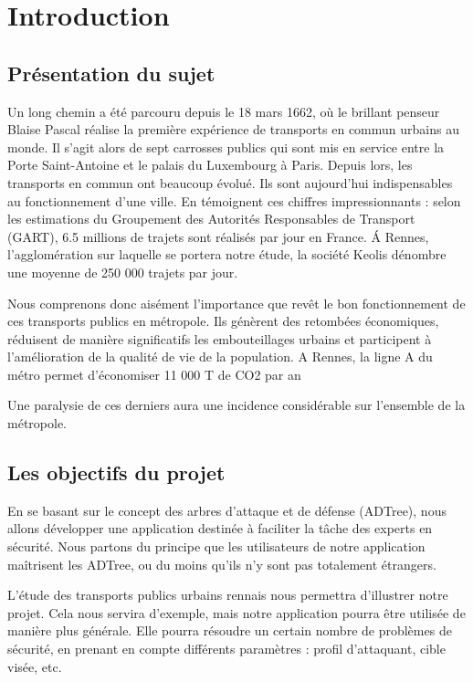 \section{Introduction}

\subsection{Présentation du sujet}


Un long chemin a été parcouru depuis le 18 mars 1662, où le brillant penseur Blaise Pascal réalise la première expérience de transports en commun urbains au monde. Il s'agit alors de sept carrosses publics qui sont mis en service entre la Porte Saint-Antoine et le palais du Luxembourg à Paris. Depuis lors, les transports en commun ont beaucoup évolué. Ils sont aujourd'hui indispensables au fonctionnement d'une ville. En témoignent ces chiffres impressionnants : selon les estimations du Groupement des Autorités Responsables de Transport (GART), 6.5 millions de trajets sont réalisés par jour en France. \'A Rennes, l'agglomération sur laquelle se portera notre étude, la société Keolis dénombre une moyenne de 250 000 trajets par jour. %


Nous comprenons donc aisément l'importance que revêt le bon fonctionnement de ces transports publics en métropole. Ils génèrent des retombées économiques, réduisent de manière significatifs les embouteillages urbains et participent à l’amélioration de la qualité de vie de la population. A Rennes, la ligne A du métro permet d'économiser 11 000 T de CO2 par an \cite{bilanLA}

 
Une paralysie de ces derniers aura une incidence considérable sur l'ensemble de la métropole.

\subsection{Les objectifs du projet}

En se basant sur le concept des arbres d’attaque et de défense (ADTree), nous allons développer une application destinée à faciliter la tâche des experts en sécurité. Nous partons du principe que les utilisateurs de notre application maîtrisent les ADTree, ou du moins qu’ils n’y sont pas totalement étrangers.


L’étude des transports publics urbains rennais nous permettra d’illustrer notre projet. Cela nous servira d’exemple, mais notre application pourra être utilisée de manière plus générale. Elle pourra résoudre un certain nombre de problèmes de sécurité, en prenant en compte différents paramètres : profil d’attaquant, cible visée, etc. 

























